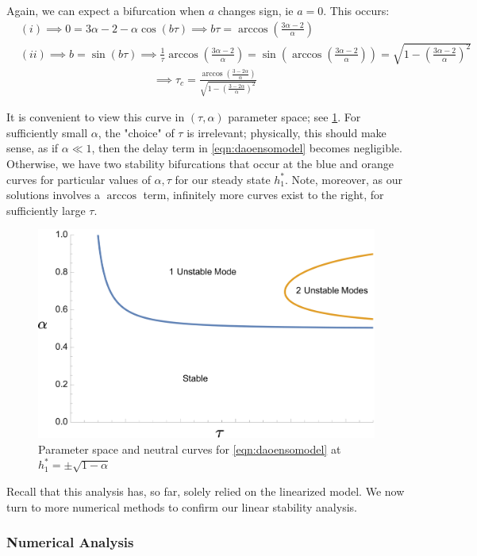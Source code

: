 \documentclass[12pt]{article}
\begin{document}
Again, we can expect a bifurcation when $a$ changes sign, ie $a = 0$. This occurs:
\begin{align*}
    &(i) \implies 0 = 3\alpha -2 - \alpha \cos (b \tau) \implies b \tau = \arccos \left(\frac{3 \alpha-2}{\alpha}\right)\\
    &(ii) \implies b = \sin (b \tau) \implies \frac{1}{\tau} \arccos \left(\frac{3 \alpha-2}{\alpha}\right) = \sin( \arccos \left(\frac{3 \alpha-2}{\alpha}\right))=\sqrt{1 - \left(\frac{3 \alpha-2}{\alpha}\right)^2}\\
    &\hspace{12em}\implies \tau_c = \frac{\arccos \left(\frac{3-2 \alpha}{\alpha}\right)}{\sqrt{1 - \left(\frac{ 3 -2\alpha}{\alpha}\right)^2}}
\end{align*}

It is convenient to view this curve in $(\tau, \alpha)$ parameter space; see \cref{fig:squareparam}. For sufficiently small $\alpha$, the "choice" of $\tau$ is irrelevant; physically, this should make sense, as if $\alpha \ll 1$, then the delay term in \cref{eqn:daoensomodel} becomes negligible. Otherwise, we have two stability bifurcations that occur at the blue and orange curves for particular values of $\alpha, \tau$ for our steady state $h_1^*$. Note, moreover, as our solutions involves a $\arccos$ term, infinitely more curves exist to the right, for sufficiently large $\tau$.
\begin{figure}[!ht]
    \centering
    \includegraphics*[width=0.55\linewidth]{figures/suarezparameter.png}
    \caption{Parameter space and neutral curves for \cref{eqn:daoensomodel} at $h_1^* = \pm\sqrt{1 - \alpha}$}
    \label{fig:squareparam}
\end{figure}

Recall that this analysis has, so far, solely relied on the linearized model. We now turn to more numerical methods to confirm our linear stability analysis.

\subsubsection{Numerical Analysis}
\end{document}
